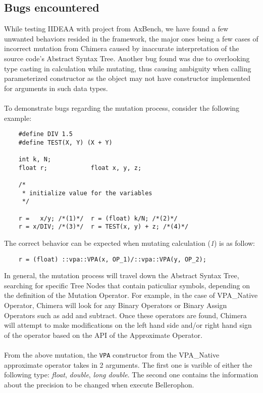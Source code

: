\subsection{Bugs encountered}

While testing IIDEAA with project from AxBench, we have found a few unwanted behaviors resided in the framework, the major ones being a few cases of incorrect mutation from Chimera caused by inaccurate interpretation of the source code's Abstract Syntax Tree. Another bug found was due to overlooking type casting in calculation while mutating, thus causing ambiguity when calling parameterized constructor as the object may not have constructor implemented for arguments in such data types. \\
~\\
To demonstrate bugs regarding the mutation process, consider the following example: 
\begin{verbatim}
	#define DIV 1.5
	#define TEST(X, Y) (X + Y)
	
	int k, N;
	float r;			float x, y, z;
	
	/*
	 * initialize value for the variables
	 */
	
	r =   x/y; /*(1)*/	r = (float) k/N; /*(2)*/
	r = x/DIV; /*(3)*/	r = TEST(x, y) + z; /*(4)*/
\end{verbatim}
The correct behavior can be expected when mutating calculation (\textit{1}) is as follow:
\begin{verbatim}
	r = (float) ::vpa::VPA(x, OP_1)/::vpa::VPA(y, OP_2);
\end{verbatim}
In general, the mutation process will travel down the Abstract Syntax Tree, searching for specific Tree Nodes that contain paticuliar symbols, depending on the definition of the Mutation Operator. For example, in the case of VPA\_Native Operator, Chimera will look for any Binary Operators or Binary Assign Operators such as add and subtract. Once these operators are found, Chimera will attempt to make modifications on the left hand side and/or right hand sign of the operator based on the API of the Approximate Operator. \\
~\\
From the above mutation, the \verb|VPA| constructor from the VPA\_Native approximate operator takes in 2 arguments. The first one is varible of either the following type: \textit{float}, \textit{double}, \textit{long double}. The second one contains the information about the precision to be changed when execute Bellerophon. \\
